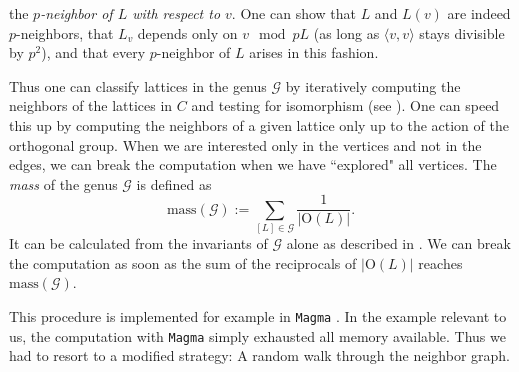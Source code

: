 \documentclass{amsart}
\numberwithin{equation}{section}
\numberwithin{table}{section}
\numberwithin{figure}{section}
\newcommand{\OG}{\mathord{\mathrm{O}}}
\newcommand{\intf}[1]{\langle #1 \rangle}
\begin{document}
the \emph{$p$-neighbor of $L$ with respect to $v$}.
One can show that
$L$ and $L(v)$ are indeed $p$-neighbors, that $L_v$ depends only on $v \mod pL$
(as long as $\intf{v,v}$ stays divisible by $p^2$),
and that every $p$-neighbor of $L$ arises in this fashion.
\par
Thus one can classify lattices in the genus $\mathcal{G}$
by iteratively computing the neighbors of the lattices in $C$ and testing for isomorphism (see \cite{isometries}).
One can speed this up by computing the neighbors of a given lattice only up to the action of the orthogonal group.
When we are interested only in the vertices and not in the edges,
we can break the computation when we have ``explored" all vertices.
The \emph{mass} of the genus $\mathcal{G}$ is defined as
\[
\mbox{mass}(\mathcal{G}):= \sum_{[L] \in \mathcal{G}} \frac{1}{|\OG(L)|}.
\]
It can be calculated from the invariants of $\mathcal{G}$ alone as described in \cite{CS1988}.
We can break the computation as soon as
the sum of the reciprocals of $|\OG(L)|$ reaches $\mbox{mass}(\mathcal{G})$.

This procedure is implemented for example in {\tt Magma} \cite{magma}.
In the example relevant to us,
the computation with {\tt Magma} simply exhausted all memory available.
Thus we had to resort to a modified strategy: A random walk through the neighbor graph.
%
%
\end{document}
